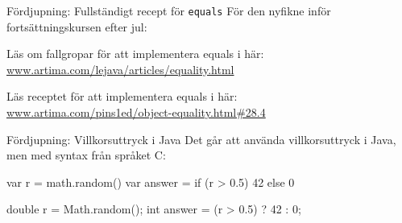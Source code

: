 \begin{Slide}{Fördjupning: Fullständigt recept för \texttt{equals}}
För den nyfikne inför fortsättningskursen efter jul: 

\vspace{1em}\noindent
Läs om fallgropar för att implementera equals i  här: \\
\href{http://www.artima.com/lejava/articles/equality.html}{www.artima.com/lejava/articles/equality.html}


\vspace{1em}\noindent
Läs receptet för att implementera equals i  här: \\
\href{http://www.artima.com/pins1ed/object-equality.html#28.4}{www.artima.com/pins1ed/object-equality.html\#28.4}
\end{Slide}





\begin{Slide}{Fördjupning: Villkorsuttryck i Java}\SlideFontSmall
Det går att använda villkorsuttryck i Java, men med syntax från språket C:
\begin{multicols}{2}
  \noindent{}
\begin{CodeSmall}[basicstyle=\ttfamily\SlideFontSize{6}{8},backgroundcolor=\color{white},
  frame=none]
var r = math.random()
var answer = if (r > 0.5) 42 else 0
\end{CodeSmall}

\columnbreak

\noindent{}
\begin{CodeSmall}[language=Java,basicstyle=\ttfamily\SlideFontSize{6}{8},backgroundcolor=\color{white},
  frame=none]
double r = Math.random();
int answer = (r > 0.5) ? 42 : 0;
\end{CodeSmall}
\end{multicols}

\end{Slide}




